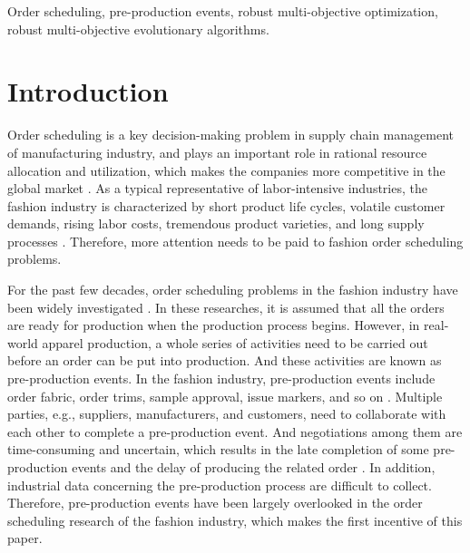 \documentclass[journal]{IEEEtran}
\theoremstyle{definition}
\begin{document}
\begin{IEEEkeywords}
Order scheduling, pre-production events, robust multi-objective optimization, robust multi-objective evolutionary algorithms.
\end{IEEEkeywords}


%
\IEEEpeerreviewmaketitle



\section{Introduction}
Order scheduling is a key decision-making problem in supply chain management of manufacturing industry, and plays an important role in rational resource allocation and utilization, which makes the companies more competitive in the global market \cite{chan2006early,brankeautomated}. As a typical representative of labor-intensive industries, the fashion industry is characterized by short product life cycles, volatile customer demands, rising labor costs, tremendous product varieties, and long supply processes \cite{csen2008us}. Therefore, more attention needs to be paid to fashion order scheduling problems.

For the past few decades, order scheduling problems in the fashion industry have been widely investigated \cite{chen2006order,guo2013modeling,wong2014intelligent}.
In these researches, it is assumed that all the orders are ready for production when the production process begins. However, in real-world apparel production, a whole series of activities need to be carried out before an order can be put into production. And these activities are known as pre-production events. In the fashion industry, pre-production events include order fabric, order trims, sample approval, issue markers, and so on \cite{hines2007fashion}. Multiple parties, e.g., suppliers, manufacturers, and customers, need to collaborate with each other to complete a pre-production event. And negotiations among them are time-consuming and uncertain, which results in the late completion of some pre-production events and the delay of producing the related order \cite{preprod}.
In addition, industrial data concerning the pre-production process are difficult to collect. Therefore, pre-production events have been largely overlooked in the order scheduling research of the fashion industry, which makes the first incentive of this paper.
\end{document}
